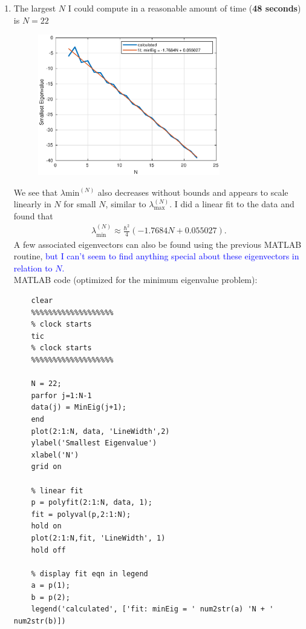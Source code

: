 \documentclass{article}
\theoremstyle{definition}
\newcommand{\f}[2]{\frac{#1}{#2}}
\newcommand{\lp}{\left(}
\newcommand{\rp}{\right)}
\begin{document}
\begin{enumerate}[label=(\alph*)]
	\item The largest $N$ I could compute in a reasonable amount of time (\textbf{48 seconds}) is $\boxed{N=22}$
	\begin{figure}[!htb]
		\centering
		\includegraphics[width=0.75\textwidth]{2f.eps}
	\end{figure} 
	We see that $\lambda{\text{min}}^{(N)}$ also decreases without bounds and appears to scale linearly in $N$ for small $N$, similar to $\lambda_\text{max}^{(N)}$. I did a linear fit to the data and found that 
	\begin{align*}
	\lambda_\text{min}^{(N)} \approx \f{\hbar^2}{4}\lp -1.7684N + 0.055027\rp .
	\end{align*} 
	A few associated eigenvectors can also be found using the previous MATLAB routine, \textcolor{blue}{but I can't seem to find anything special about these eigenvectors in relation to $N$.}\\
	
	
	
	
	
	MATLAB code (optimized for the minimum eigenvalue problem):
	\begin{lstlisting}
	clear 
	%%%%%%%%%%%%%%%%%%%
	% clock starts
	tic 
	% clock starts
	%%%%%%%%%%%%%%%%%%%
	
	N = 22;
	parfor j=1:N-1
	data(j) = MinEig(j+1);
	end
	plot(2:1:N, data, 'LineWidth',2)
	ylabel('Smallest Eigenvalue')
	xlabel('N')
	grid on
	
	% linear fit
	p = polyfit(2:1:N, data, 1);
	fit = polyval(p,2:1:N);
	hold on
	plot(2:1:N,fit, 'LineWidth', 1)
	hold off
	
	% display fit eqn in legend
	a = p(1);
	b = p(2);
	legend('calculated', ['fit: minEig = ' num2str(a) 'N + ' num2str(b)])
	
	
	

\end{lstlisting}
\end{enumerate}
\end{document}
